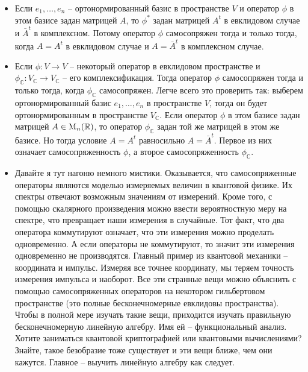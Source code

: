 \begin{itemize}
\item Если $e_1,\ldots,e_n$ -- ортонормированный базис в пространстве $V$ и оператор $\phi$ в этом базисе задан матрицей $A$, то $\phi^*$ задан матрицей $A^t$ в евклидовом случае и $\bar A^t$ в комплексном.
Потому оператор $\phi$ самосопряжен тогда и только тогда, когда $A = A^t$ в евклидовом случае и $A = \bar A^t$ в комплексном случае.

\item Если $\phi\colon V\to V$ -- некоторый оператор в евклидовом пространстве и $\phi_\mathbb C\colon V_\mathbb C\to V_\mathbb C$ -- его комплексификация.
Тогда оператор $\phi$ самосопряжен тогда и только тогда, когда $\phi_\mathbb C$ самосопряжен.
Легче всего это проверить так: выберем ортонормированный базис $e_1,\ldots,e_n$ в пространстве $V$, тогда он будет ортонормированным в пространстве $V_\mathbb C$.
Если оператор $\phi$ в этом базисе задан матрицей $A\in \operatorname{M}_{n}(\mathbb R)$, то оператор $\phi_\mathbb C$ задан той же матрицей в этом же базисе.
Но тогда условие $A = A^t$ равносильно $A = \bar A^t$.
Первое из них означает самосопряженность $\phi$, а второе самосопряженность $\phi_\mathbb C$.

\item Давайте я тут нагоню немного мистики.
Оказывается, что самосопряженные операторы являются моделью измеряемых величин в квантовой физике.
Их спектры отвечают возможным значениям от измерений.
Кроме того, с помощью скалярного произведения можно ввести вероятностную меру на спектре, что превращает наши измерения в случайные.
Тот факт, что два оператора коммутируют означает, что эти измерения можно проделать одновременно.
А если операторы не коммутируют, то значит эти измерения одновременно не производятся.
Главный пример из квантовой механики -- координата и импульс.
Измеряя все точнее координату, мы теряем точность измерения импульса и наоборот.
Все эти странные вещи можно объяснить с помощью самосопряженных операторов на некотором гильбертовом пространстве (это полные бесконечномерные евклидовы пространства).
Чтобы в полной мере изучать такие вещи, приходится изучать правильную бесконечномерную линейную алгебру.
Имя ей -- функциональный анализ.
Хотите заниматься квантовой криптографией или квантовыми вычислениями?
Знайте, такое безобразие тоже существует и эти вещи ближе, чем они кажутся.
Главное -- выучить линейную алгебру как следует.
\end{itemize}

